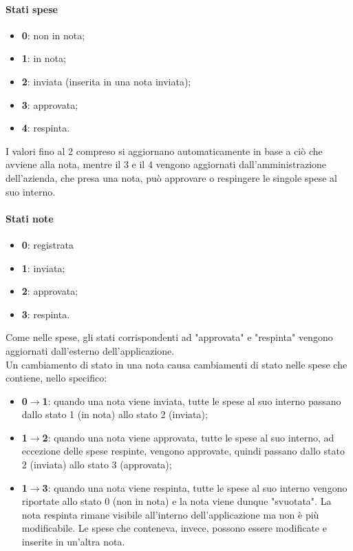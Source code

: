 \paragraph{Stati spese}
\begin{itemize}
    \item \textbf{0}: non in nota;
    \item \textbf{1}: in nota;
    \item \textbf{2}: inviata (inserita in una nota inviata);
    \item \textbf{3}: approvata;
    \item \textbf{4}: respinta.
\end{itemize}

\noindent I valori fino al 2 compreso si aggiornano automaticamente in base a ciò che avviene alla nota, mentre il 3 e il 4 vengono aggiornati dall'amministrazione dell'azienda, che presa una nota, può approvare o respingere le singole spese al suo interno.

\paragraph{Stati note}
\begin{itemize}
    \item \textbf{0}: registrata
    \item \textbf{1}: inviata;
    \item \textbf{2}: approvata;
    \item \textbf{3}: respinta.
\end{itemize}

\noindent Come nelle spese, gli stati corrispondenti ad "approvata" e "respinta" vengono aggiornati dall'esterno dell'applicazione.\\
Un cambiamento di stato in una nota causa cambiamenti di stato nelle spese che contiene, nello specifico:
\begin{itemize}
    \item \textbf{0$\to$1}: quando una nota viene inviata, tutte le spese al suo interno passano dallo stato 1 (in nota) allo stato 2 (inviata);
    \item \textbf{1$\to$2}: quando una nota viene approvata, tutte le spese al suo interno, ad eccezione delle spese respinte, vengono approvate, quindi passano dallo stato 2 (inviata) allo stato 3 (approvata);
    \item \textbf{1$\to$3}: quando una nota viene respinta, tutte le spese al suo interno vengono riportate allo stato 0 (non in nota) e la nota viene dunque "svuotata". La nota respinta rimane visibile all'interno dell'applicazione ma non è più modificabile. Le spese che conteneva, invece, possono essere modificate e inserite in un'altra nota.
\end{itemize}

